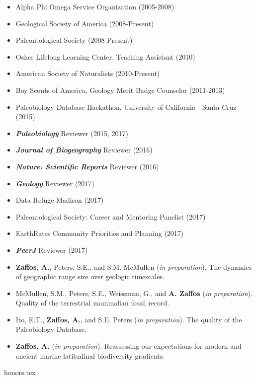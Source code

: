 \documentclass[12pt, a4paper]{awesome-cv}
\newcommand*{\sectiondir}{resume/}
\begin{document}
\fontsize{10pt}{1em}\bodyfontlight\upshape\color{text}
\begin{itemize}[leftmargin=*]
\item{Alpha Phi Omega Service Organization (2005-2008)}
\item{Geological Society of America (2008-Present)}
\item{Paleontological Society (2008-Present)}
\item{Osher Lifelong Learning Center, Teaching Assistant (2010)}
\item{American Society of Naturalists (2010-Present)}
\item{Boy Scouts of America, Geology Merit Badge Counselor (2011-2013)}
\item{Paleobiology Database Hackathon, University of California - Santa Cruz (2015)}
\item{\textbf{\textit{Paleobiology}} Reviewer (2015, 2017)}
\item{\textbf{\textit{Journal of Biogeography}} Reviewer (2016)}
\item{\textbf{\textit{Nature: Scientific Reports}} Reviewer (2016)}
\item{\textbf{\textit{Geology}} Reviewer (2017)}
\item{Data Refuge Madison (2017)}
\item{Paleontological Society: Career and Mentoring Panelist (2017)}
\item{EarthRates Community Priorities and Planning (2017)}
\item{\textbf{\textit{PeerJ}} Reviewer (2017)}
\end{itemize}

\fontsize{10pt}{1em}\bodyfontlight\upshape\color{text}
\begin{itemize}[leftmargin=*]
\item{\textbf{Zaffos, A.}, Peters, S.E., and S.M. McMullen (\textit{in preparation}). The dynamics of geographic range size over geologic timescales.}
\item{McMullen, S.M., Peters, S.E., Weissman, G., and \textbf{A. Zaffos} (\textit{in preparation}). Quality of the terrestrial mammalian fossil record.}
\item{Ito, E.T., \textbf{Zaffos, A.}, and S.E. Peters (\textit{in preparation}). The quality of the Paleobiology Database.}
\item{\textbf{Zaffos, A.} (\textit{in preparation}). Reassessing our expectations for modern and ancient marine latitudinal biodiversity gradients.}
\end{itemize}

{honors.tex}
\end{document}
